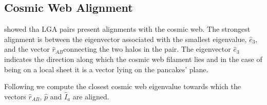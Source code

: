 \documentclass[a4paper,fleqn,usenatbib]{mnras}
\begin{document}
\subsection{Cosmic Web Alignment}
\label{sub:webalignment}

\cite{2015ApJ...799...45F} showed tha LGA pairs present alignments
with the cosmic web.
The strongest alignment is between the eigenvector associated  with the smallest
eigenvalue, $\hat{e}_3$, and the vector $\hat{r}_{AB} $connecting the two halos in
the pair. 
The eigenvector $\hat{e}_3$ indicates the direction along
which the cosmic web filament lies and in the case of being on a local
sheet it is a vector lying on the pancakes' plane. 

Following \cite{2014MNRAS.443.1090F} we compute the closest cosmic web
eigenvalue  towards which the vectors $\hat{r}_{AB}$, $\hat{p}$ and
$\hat{I}_a$ are aligned. 







\end{document}
